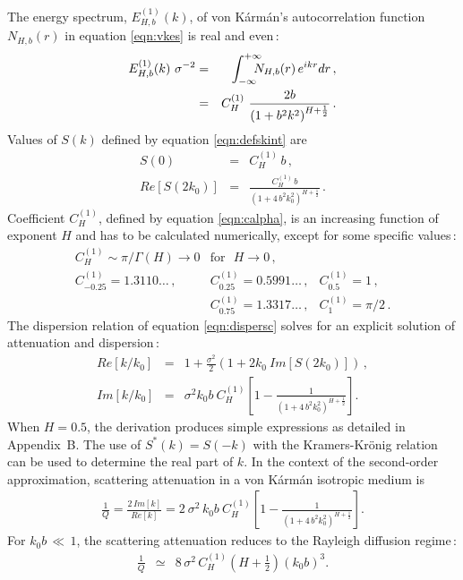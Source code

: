 The energy spectrum, $E^{(1)}_{H,b}(k)$, of von K\'arm\'an's autocorrelation 
function $N_{H,b}(r)$ in equation \ref{eqn:vkes} is real and even\,:
\begin{eqnarray}
{E^{(1)}_{H,b}(k)}~{\sigma^{-2}} & = & \int_{-\infty}^{+\infty}\hspace{-3mm}N_{H,b}(r)\,e^{ikr}dr\,,\\
& = & C^{(1)}_{H}~\frac{2b}{\left(1+b^2k^2\right)^{H+\frac{1}{2}}}\,.
\end{eqnarray}
Values of $S(k)$ defined by equation \ref{eqn:defskint} are
\begin{eqnarray}
S(0) & = & C^{(1)}_{H}\,b\,, \\
Re[S(2k_0)] & = & \frac{C^{(1)}_{H}\,b}{(1+4\,b^2k_0^2)^{H+\frac{1}{2}}}\,.
\end{eqnarray}
Coefficient $C^{(1)}_{H}$, defined by equation \ref{eqn:calpha}, is an increasing function of exponent $H$
and has to be calculated numerically, except for some specific values\,:
$$
\begin{array}{lll}
C^{(1)}_{H}\sim{\pi}/{\Gamma(H)}\rightarrow 0 & \mbox{for}\ \ \ H\rightarrow 0\,, & \\
C^{(1)}_{-0.25}=1.3110\ldots\,, & C^{(1)}_{0.25}=0.5991\ldots\,, & C^{(1)}_{0.5}=1\,, \nonumber \\
 & C^{(1)}_{0.75}=1.3317\ldots\,, & C^{(1)}_{1}=\pi/2\,.
\nonumber
\end{array}
$$
The dispersion relation of equation \ref{eqn:dispersc} solves for an explicit solution of attenuation and dispersion\,:
\begin{eqnarray}
Re[k/k_0] & = & 1+\frac{\sigma^2}{2}\left(1+2k_0~Im[S(2k_0)]\right)\,,\\
Im[k/k_0] & = & \sigma^2k_0b~C^{(1)}_{H}
\left[1-\frac{1}{(1+4\,b^2k_0^2)^{H+\frac{1}{2}}} \right].
\end{eqnarray}
When $H=0.5$, the derivation produces simple expressions as detailed in Appendix~B.
The use of $S^{\ast}(k)=S(-k)$ with the Kramers-Kr\"{o}nig relation can be used 
to determine the real part of $k$.
In the context of the second-order approximation,
scattering attenuation in a von K\'arm\'an isotropic medium is
\begin{eqnarray}
\frac{1}{Q} = \frac{2\,Im[k]}{Re[k]} = 2~\sigma^2\,k_0b~C^{(1)}_{H}
\left[1-\frac{1}{(1+4\,b^2k_0^2)^{H+\frac{1}{2}}}\right].
\end{eqnarray}
For $k_0b\,\ll\,1$, the scattering attenuation reduces to the Rayleigh diffusion regime\,:
\begin{eqnarray}
\frac{1}{Q} & \simeq & 8\,\sigma^2\,C^{(1)}_{H}\left(H+\frac{1}{2}\right)\left(k_0b\right)^3.
\end{eqnarray}


